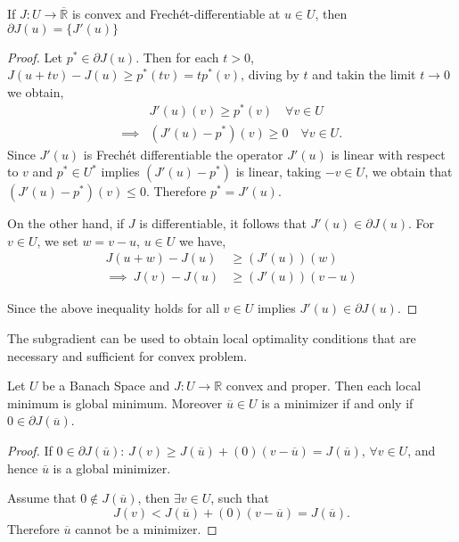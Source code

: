 \begin{theorem}
	If $J: U\rightarrow \overline{\mathbb{R}}$ is convex and Frech\'et-differentiable at $u\in U$, then $\partial J(u)=\lbrace J'(u)\rbrace$
	
	\begin{proof}
		Let $p^* \in \partial J(u)$. Then for each $t>0$, $J(u+tv)-J(u)\geq p^*(tv)=tp^*(v)$, diving by $t$ and takin the limit $t\rightarrow 0$ we obtain,
		\begin{align}
			&J'(u)(v) \geq p^*(v) \quad \forall v \in U \\
	\implies& (J'(u)-p^*)(v) \geq 0 \quad \forall v \in U.
		\end{align}
	Since $J'(u)$ is Frech\'et differentiable the operator $J'(u)$ is linear with respect to $v$ and $p^* \in U^*$ implies $(J'(u)-p^*)$ is linear, taking $-v \in U$, we obtain that $(J'(u)-p^*)(v)\leq 0$. Therefore $p^*=J'(u)$.
	
	On the other hand, if $J$ is differentiable, it follows that $J'(u)\in \partial J(u)$. For $v\in U$, we set $w=v-u$, $u\in U$ we have, 
	\begin{align}
		    J(u+w)-J(u)&\geq (J'(u))(w) \\
	\implies \ J(v)-J(u)&\geq (J'(u))(v-u)
	\end{align}
	
	Since the above inequality holds for all $v \in U$ implies $J'(u) \in \partial J(u)$.
	\end{proof}
\end{theorem}
\begin{remark}
	The subgradient can be used to obtain local optimality conditions that are necessary and sufficient for convex problem.
\end{remark}
\begin{theorem}
	Let $U$ be a Banach Space and $J: U \rightarrow \mathbb{R}$ convex and proper. Then each local minimum is global minimum.
	Moreover $\overline{u}\in U$ is a minimizer if and only if $0 \in \partial J(\overline{u})$.
	\begin{proof}
		If $0 \in \partial J(\overline{u})$: $J(v) \geq J(\overline{u})+ (0)(v-\overline{u})=J(\overline{u})$, $\forall v\in U$, and hence $\overline{u}$ is a global minimizer. 
		
		
		Assume that $0 \notin J(\overline{u})$, then $\exists v \in U$, such that
		\[
			J(v) < J(\overline{u}) + (0)(v-\overline{u}) = J(\overline{u}).
		\]
		Therefore $\overline{u}$ cannot be a minimizer.
	\end{proof}
\end{theorem}

